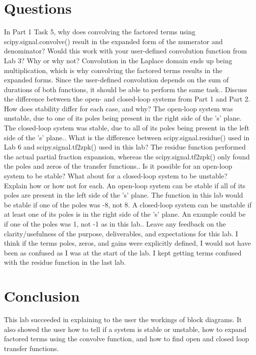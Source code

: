 \documentclass[12pt]{article}
\begin{document}
\section{Questions}
In Part 1 Task 5, why does convolving the factored terms using scipy.signal.convolve() result in the expanded form of the numerator and denominator? Would this work with your user-defined convolution function from Lab 3? Why or why not?\newline
Convolution in the Laplace domain ends up being multiplication, which is why convolving the factored terms results in the expanded forms. Since the user-defined convolution depends on the sum of durations of both functions, it should be able to perform the same task.. Discuss the difference between the open- and closed-loop systems from Part 1 and Part 2.
How does stability differ for each case, and why?\newline
The open-loop system was unstable, due to one of its poles being present in the right side of the 's' plane. The closed-loop system was stable, due to all of its poles being present in the left side of the 's' plane.. What is the difference between scipy.signal.residue() used in Lab 6 and scipy.signal.tf2zpk() used in this lab?\newline
The residue function performed the actual partial fraction expansion, whereas the scipy.signal.tf2zpk() only found the poles and zeros of the transfer functions.. Is it possible for an open-loop system to be stable? What about for a closed-loop system to
be unstable? Explain how or how not for each.\newline
An open-loop system can be stable if all of its poles are present in the left side of the 's' plane. The function in this lab would be stable if one of the poles was -8, not 8.\newline
A closed-loop system can be unstable if at least one of its poles is in the right side of the 's' plane. An example could be if one of the poles was 1, not -1 as in this lab.. Leave any feedback on the clarity/usefulness of the purpose, deliverables, and expectations for this lab.\newline
I think if the terms poles, zeros, and gains were explicitly defined, I would not have been as confused as I was at the start of the lab. I kept getting terms confused with the residue function in the last lab.
\section{Conclusion}
This lab succeeded in explaining to the user the workings of block diagrams. It also showed the user how to tell if a system is stable or unstable, how to expand factored terms using the convolve function, and how to find open and closed loop transfer functions.
\end{document}
